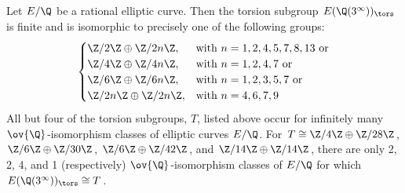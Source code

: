 \begin{frame}[plain]
\footnotesize
\begin{thm}
Let $E/\Q$ be a rational elliptic curve. Then the torsion subgroup $E(\Q(3^\infty))_\tors$ is finite and is isomorphic to precisely one of the following groups:
	\[
	\begin{cases}
	\Z/2\Z \oplus \Z/2n\Z, & \text{with } n= 1, 2, 4, 5, 7, 8, 13 \text{ or} \\
	\Z/4\Z \oplus \Z/4n\Z, & \text{with } n= 1, 2, 4, 7 \text{ or} \\
	\Z/6\Z \oplus \Z/6n\Z, & \text{with } n= 1, 2, 3, 5, 7 \text{ or} \\
	\Z/2n\Z \oplus \Z/2n\Z, & \text{with } n= 4, 6, 7, 9 \\
	\end{cases}
	\]
All but four of the torsion subgroups, $T$, listed above occur for infinitely many $\ov{\Q}$-isomorphism classes of elliptic curves $E/\Q$. For $T \cong \Z/4\Z \oplus \Z/28\Z$, $\Z/6\Z \oplus \Z/30\Z$, $\Z/6\Z \oplus \Z/42\Z$, and $\Z/14\Z \oplus \Z/14\Z$, there are only 2, 2, 4, and 1 (respectively) $\ov{\Q}$-isomorphism classes of $E/\Q$ for which $E(\Q(3^\infty))_\tors \cong T$. 
\end{thm}
	\begin{figure}[h]
	\centering
	\begin{subfigure}{0.23\textwidth}
	\captionsetup{labelformat=empty}
	\centering

\end{subfigure}
\end{figure}
\end{frame}
